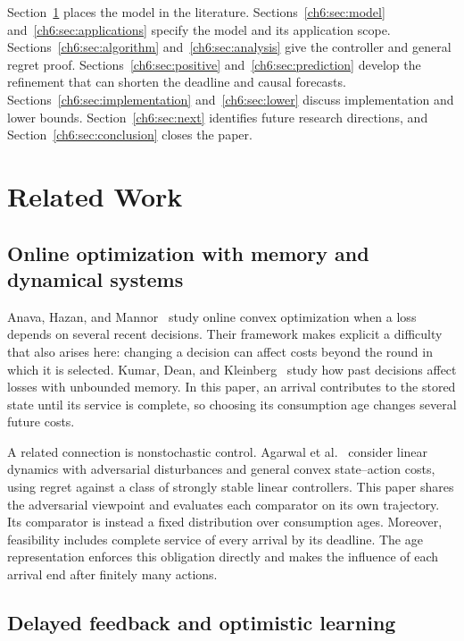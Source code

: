 \documentclass[11pt]{article}
\theoremstyle{plain}
\theoremstyle{remark}
\numberwithin{equation}{section}
\begin{document}
Section~\ref{ch6:sec:related} places the model in the literature.
Sections~\ref{ch6:sec:model} and~\ref{ch6:sec:applications} specify the
model and its application scope. Sections~\ref{ch6:sec:algorithm}
and~\ref{ch6:sec:analysis} give the controller and general regret proof.
Sections~\ref{ch6:sec:positive} and~\ref{ch6:sec:prediction} develop the
refinement that can shorten the deadline and causal forecasts.
Sections~\ref{ch6:sec:implementation} and~\ref{ch6:sec:lower} discuss
implementation and lower bounds. Section~\ref{ch6:sec:next} identifies
future research directions, and Section~\ref{ch6:sec:conclusion} closes
the paper.

\section{Related Work}
\label{ch6:sec:related}

\subsection{Online optimization with memory and dynamical systems}

Anava, Hazan, and Mannor~\cite{anava2015memory} study online convex
optimization when a loss depends on several recent decisions. Their
framework makes explicit a difficulty that also arises here: changing a
decision can affect costs beyond the round in which it is selected.
Kumar, Dean, and Kleinberg~\cite{kumar2023unbounded} study how past decisions
affect losses with unbounded memory. In this paper, an arrival
contributes to the stored state until its service is complete, so choosing
its consumption age changes several future costs.

A related connection is nonstochastic control. Agarwal
et al.~\cite{agarwal2019online} consider linear dynamics with adversarial
disturbances and general convex state--action costs, using regret against
a class of strongly stable linear controllers. This paper shares the
adversarial viewpoint and evaluates each comparator on its own trajectory.
Its comparator is instead a fixed distribution over consumption ages.
Moreover, feasibility includes complete service of every arrival by its
deadline. The age representation enforces this obligation directly and
makes the influence of each arrival end after finitely many actions.

\subsection{Delayed feedback and optimistic learning}
\end{document}
